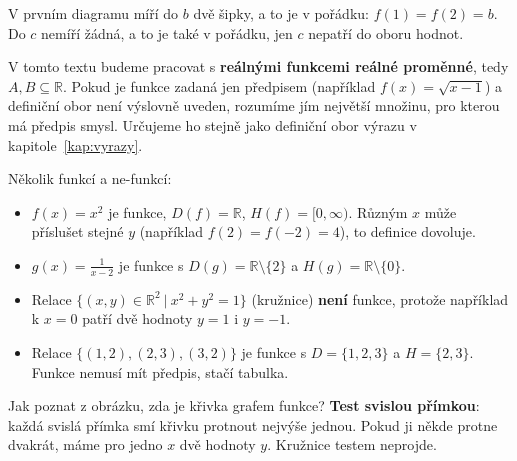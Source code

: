 V prvním diagramu míří do $b$ dvě šipky, a to je v pořádku: $f(1) = f(2) = b$. Do $c$ nemíří žádná, a to je také v pořádku, jen $c$ nepatří do oboru hodnot.

V tomto textu budeme pracovat s \textbf{reálnými funkcemi reálné proměnné}, tedy $A, B\subseteq\mathbb{R}$. Pokud je funkce zadaná jen předpisem (například $f(x) = \sqrt{x - 1}$) a definiční obor není výslovně uveden, rozumíme jím největší množinu, pro kterou má předpis smysl. Určujeme ho stejně jako definiční obor výrazu v kapitole~\ref{kap:vyrazy}.

\begin{example}
  Několik funkcí a ne-funkcí:
  \begin{itemize}
    \item $f(x) = x^2$ je funkce, $D(f) = \mathbb{R}$, $H(f) = [0, \infty)$. Různým $x$ může příslušet stejné $y$ (například $f(2) = f(-2) = 4$), to definice dovoluje.
    \item $g(x) = \frac{1}{x - 2}$ je funkce s $D(g) = \mathbb{R}\setminus\{2\}$ a $H(g) = \mathbb{R}\setminus\{0\}$.
    \item Relace $\{(x, y)\in\mathbb{R}^2\ |\ x^2 + y^2 = 1\}$ (kružnice) \textbf{není} funkce, protože například k $x = 0$ patří dvě hodnoty $y = 1$ i $y = -1$.
    \item Relace $\{(1, 2), (2, 3), (3, 2)\}$ je funkce s $D = \{1, 2, 3\}$ a $H = \{2, 3\}$. Funkce nemusí mít předpis, stačí tabulka.
  \end{itemize}
\end{example}

\begin{note}
  Jak poznat z obrázku, zda je křivka grafem funkce? \textbf{Test svislou přímkou}: každá svislá přímka smí křivku protnout nejvýše jednou. Pokud ji někde protne dvakrát, máme pro jedno $x$ dvě hodnoty $y$. Kružnice testem neprojde.
\end{note}

